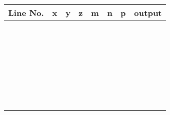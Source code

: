 \documentclass[12pt]{article}
\begin{document}


\newpage

\renewcommand{\arraystretch}{1.5}
\begin{tabular}{|c|c|c|c|c|c|c|p{5cm}|}
   \hline
   Line No. & x & y & z & m & n & p & output\\\hline
   \hspace{1cm} & \hspace{1cm} & \hspace{1cm} & \hspace{1cm} & \hspace{1cm} &
   \hspace{1cm} & \hspace{1cm} & \\\hline
   &&&&&&&\\\hline
   &&&&&&&\\\hline
   &&&&&&&\\\hline
   &&&&&&&\\\hline
   &&&&&&&\\\hline
   &&&&&&&\\\hline
   &&&&&&&\\\hline
   &&&&&&&\\\hline
   &&&&&&&\\\hline
   &&&&&&&\\\hline
   &&&&&&&\\\hline
   &&&&&&&\\\hline
   &&&&&&&\\\hline
   &&&&&&&\\\hline
   &&&&&&&\\\hline
   &&&&&&&\\\hline
   &&&&&&&\\\hline
   &&&&&&&\\\hline
   &&&&&&&\\\hline
   &&&&&&&\\\hline
   &&&&&&&\\\hline
   &&&&&&&\\\hline
   &&&&&&&\\\hline
   &&&&&&&\\\hline
   &&&&&&&\\\hline
   &&&&&&&\\\hline
   &&&&&&&\\\hline
   &&&&&&&\\\hline
\end{tabular}
\end{document}
